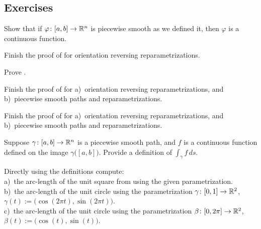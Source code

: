 
\subsection{Exercises}

\begin{exercise}
Show that if $\varphi \colon [a,b] \to {\mathbb{R}}^n$ is piecewise smooth as we
defined it, then $\varphi$ is a continuous function.
\end{exercise}

\begin{exercise}
Finish the proof of  for orientation
reversing reparametrizations.
\end{exercise}

\begin{exercise}
Prove .
\end{exercise}



\begin{exercise} \label{mv:exercise:pathpiece}
Finish the proof of 
for a)~orientation reversing reparametrizations, and b)~piecewise smooth paths
and reparametrizations.
\end{exercise}

\begin{exercise} \label{mv:exercise:linepiece}
Finish the proof of 
for a)~orientation reversing reparametrizations, and b)~piecewise smooth paths
and reparametrizations.
\end{exercise}

\begin{exercise}
Suppose $\gamma \colon [a,b] \to {\mathbb{R}}^n$ is a piecewise smooth path, and $f$ is a
continuous function defined on the image $\gamma\bigl([a,b]\bigr)$.
Provide a definition of $\int_{\gamma} f \,ds$.
\end{exercise}

\begin{exercise}
Directly using the definitions compute:\\
a)~the arc-length of the unit square from
 using the given parametrization.
\\
b)~the arc-length of the unit circle using the parametrization
$\gamma \colon [0,1] \to {\mathbb{R}}^2$, $\gamma(t) := \bigl(\cos(2\pi t),\sin(2\pi t)\bigr)$.
\\
c)~the arc-length of the unit circle using the parametrization
$\beta \colon [0,2\pi] \to {\mathbb{R}}^2$, $\beta(t) := \bigl(\cos(t),\sin(t)\bigr)$.
\end{exercise}

